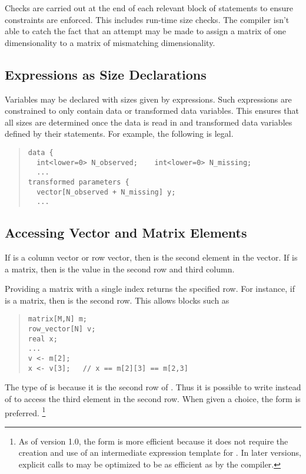 Checks are carried out at the end of each relevant block of statements
to ensure constraints are enforced.  This includes run-time size
checks.  The \Stan compiler isn't able to catch the fact that an
attempt may be made to assign a matrix of one dimensionality to a
matrix of mismatching dimensionality.  


\subsection{Expressions as Size Declarations}

Variables may be declared with sizes given by expressions.  Such
expressions are constrained to only contain data or transformed data
variables.  This ensures that all sizes are determined once the data
is read in and transformed data variables defined by their statements.
For example, the following is legal.
%
\begin{quote}
\begin{Verbatim}[fontsize=\small]
data {
  int<lower=0> N_observed;    int<lower=0> N_missing;
  ...
transformed parameters {
  vector[N_observed + N_missing] y;
  ...
\end{Verbatim}
\end{quote}

\subsection{Accessing Vector and Matrix Elements}

If  is a column vector or row vector, then  is the
second element in the vector.  If  is a matrix, then
 is the value in the second row and third column.

Providing a matrix with a single index returns the specified row.  For
instance, if  is a matrix, then  is the second row.
This allows \Stan blocks such as
%
\begin{quote}
\begin{Verbatim} 
matrix[M,N] m;    
row_vector[N] v;    
real x;
...
v <- m[2];   
x <- v[3];   // x == m[2][3] == m[2,3]
\end{Verbatim}
\end{quote}
% 
The type of  is  because it is the second
row of .  Thus it is possible to write  instead
of  to access the third element in the second row.  When
given a choice, the form  is preferred.%
%
\footnote{As of \Stan version 1.0, the form
   is more efficient because it does not require the
  creation and use of an intermediate expression template for
  .  In later versions, explicit calls to 
  may be optimized to be as efficient as  by the \Stan
  compiler.\label{array-index-style.footnote}}


